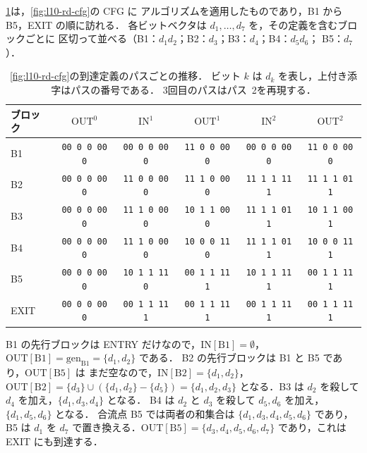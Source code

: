 \documentclass[../main.tex]{subfiles}
\begin{document}
\cref{tab:l10-rd-trace}は，\cref{fig:l10-rd-cfg}の CFG に
アルゴリズムを適用したものであり，B1 から B5，EXIT の順に訪れる．
各ビットベクタは $d_1,\dots,d_7$ を，その定義を含むブロックごとに
区切って並べる（B1：$d_1d_2$；B2：$d_3$；B3：$d_4$；B4：$d_5d_6$；
B5：$d_7$）．

\begin{table}[tb]
  \centering
  \small
  \setlength{\tabcolsep}{3pt}%
  \caption{\cref{fig:l10-rd-cfg}の到達定義のパスごとの推移．
    ビット $k$ は $d_k$ を表し，上付き添字はパスの番号である．
    3回目のパスはパス~2を再現する．}
  \label{tab:l10-rd-trace}
  \begin{tabular}{@{}l*{5}{c}@{}}
    \toprule
    ブロック & $\mathrm{OUT}^0$ & $\mathrm{IN}^1$ & $\mathrm{OUT}^1$
      & $\mathrm{IN}^2$ & $\mathrm{OUT}^2$ \\
    \midrule
    B1 & \texttt{00 0 0 00 0} & \texttt{00 0 0 00 0} & \texttt{11 0 0 00 0}
       & \texttt{00 0 0 00 0} & \texttt{11 0 0 00 0} \\
    B2 & \texttt{00 0 0 00 0} & \texttt{11 0 0 00 0} & \texttt{11 1 0 00 0}
       & \texttt{11 1 1 11 1} & \texttt{11 1 1 01 1} \\
    B3 & \texttt{00 0 0 00 0} & \texttt{11 1 0 00 0} & \texttt{10 1 1 00 0}
       & \texttt{11 1 1 01 1} & \texttt{10 1 1 00 1} \\
    B4 & \texttt{00 0 0 00 0} & \texttt{11 1 0 00 0} & \texttt{10 0 0 11 0}
       & \texttt{11 1 1 01 1} & \texttt{10 0 0 11 1} \\
    B5 & \texttt{00 0 0 00 0} & \texttt{10 1 1 11 0} & \texttt{00 1 1 11 1}
       & \texttt{10 1 1 11 1} & \texttt{00 1 1 11 1} \\
    EXIT & \texttt{00 0 0 00 0} & \texttt{00 1 1 11 1} & \texttt{00 1 1 11 1}
       & \texttt{00 1 1 11 1} & \texttt{00 1 1 11 1} \\
    \bottomrule
  \end{tabular}
\end{table}

\begin{example}[1回目のパス]
  \label{ex:l10-pass1}
  B1 の先行ブロックは ENTRY だけなので，$\mathrm{IN}[\mathrm{B1}]=\emptyset$，
  $\mathrm{OUT}[\mathrm{B1}]=\mathrm{gen}_{\mathrm{B1}}=\{d_1,d_2\}$ である．
  B2 の先行ブロックは B1 と B5 であり，$\mathrm{OUT}[\mathrm{B5}]$ は
  まだ空なので，$\mathrm{IN}[\mathrm{B2}]=\{d_1,d_2\}$，
  $\mathrm{OUT}[\mathrm{B2}]=\{d_3\}\cup(\{d_1,d_2\}-\{d_5\})=\{d_1,d_2,d_3\}$
  となる．B3 は $d_2$ を殺して $d_4$ を加え，$\{d_1,d_3,d_4\}$ となる．
  B4 は $d_2$ と $d_3$ を殺して $d_5,d_6$ を加え，$\{d_1,d_5,d_6\}$ となる．
  合流点 B5 では両者の和集合は $\{d_1,d_3,d_4,d_5,d_6\}$ であり，B5 は
  $d_1$ を $d_7$ で置き換える．$\mathrm{OUT}[\mathrm{B5}]=\{d_3,d_4,d_5,d_6,d_7\}$
  であり，これは EXIT にも到達する．
\end{example}
\end{document}
